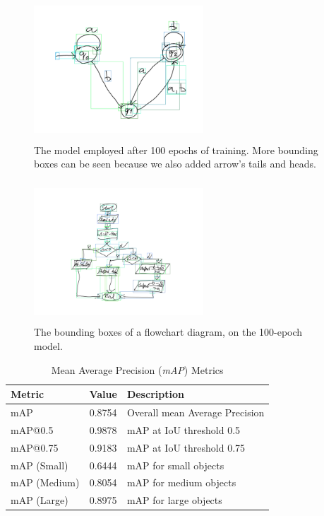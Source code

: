 \documentclass[conference]{IEEEtran}
\begin{document}
\begin{figure}[H]
	\centering
	\includegraphics[width=180pt, height=150pt]{bbox3.png}
	\caption{The model employed after 100 epochs of training. More bounding boxes can be seen because we also added arrow's tails and heads.}
	\label{fig:bbox3}
\end{figure}

\begin{figure}[H]
	\centering
	\includegraphics[width=180pt, height=150pt]{fc.png}
	\caption{The bounding boxes of a flowchart diagram, on the 100-epoch model.}
	\label{fig:fc}
\end{figure}

\begin{table}[htbp]
	\centering
	\caption{Mean Average Precision (\textit{mAP}) Metrics}
	\begin{tabular}{|l|c|l|}
		\hline
		\textbf{Metric} & \textbf{Value} & \textbf{Description} \\
		\hline
		mAP & 0.8754 & Overall mean Average Precision \\
		mAP@0.5 & 0.9878 & mAP at IoU threshold 0.5 \\
		mAP@0.75 & 0.9183 & mAP at IoU threshold 0.75 \\
		\hline
		mAP (Small) & 0.6444 & mAP for small objects \\
		mAP (Medium) & 0.8054 & mAP for medium objects \\
		mAP (Large) & 0.8975 & mAP for large objects \\
		\hline
	\end{tabular}
	\label{tab:map}
\end{table}
\end{document}
